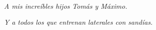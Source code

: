 %
%

\thispagestyle{empty}

~
\vspace{4cm plus 1cm minus 1cm}

\hspace{\fill}
\parbox{10cm}{
\begin{flushright}
\textsl{A mis increíbles hijos Tomás y Máximo.}

\medskip

\textsl{Y a todos los que entrenan laterales con sandías.}
\end{flushright}
}
\hspace{1cm}

